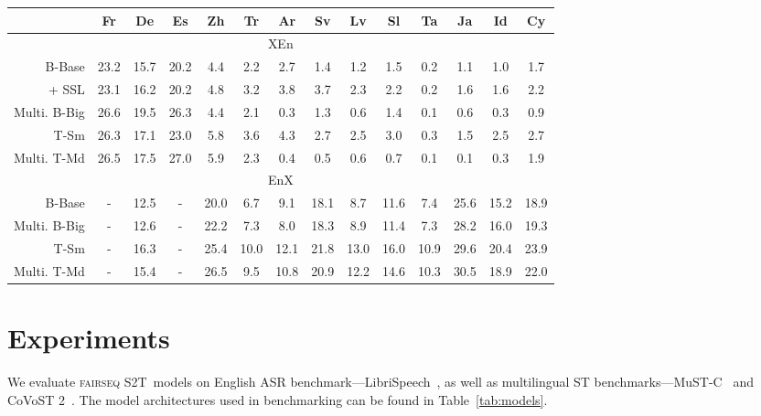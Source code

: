 \documentclass[11pt,a4paper]{article}
\newcommand{\stot}{\textsc{fairseq S2T}}
\begin{document}
\begin{table*}[t]
    \small
    \centering
    \begin{tabular}{r|ccccccccccccc}
    \toprule
         & Fr & De & Es & Zh & Tr & Ar & Sv & Lv & Sl & Ta & Ja & Id & Cy \\
         \midrule
         \multicolumn{14}{c}{XEn} \\
         \midrule
         B-Base & 23.2 & 15.7 & 20.2 & 4.4 & 2.2 & 2.7 & 1.4 & 1.2 & 1.5 & 0.2 & 1.1 & 1.0 & 1.7 \\
         + SSL & 23.1& 16.2& 20.2& 4.8& 3.2& 3.8& 3.7& 2.3& 2.2& 0.2& 1.6& 1.6& 2.2 \\
         Multi. B-Big & 26.6 & 19.5 & 26.3 & 4.4 & 2.1 & 0.3 & 1.3 & 0.6 & 1.4 & 0.1 & 0.6 & 0.3 & 0.9 \\
         T-Sm & 26.3 & 17.1 & 23.0 & 5.8 & 3.6 & 4.3 & 2.7 & 2.5 & 3.0 & 0.3 & 1.5 & 2.5 & 2.7 \\
         Multi. T-Md & 26.5 & 17.5 & 27.0 & 5.9 & 2.3 & 0.4 & 0.5 & 0.6 & 0.7 & 0.1 & 0.1 & 0.3 & 1.9 \\
         \midrule
         \multicolumn{14}{c}{EnX} \\
         \midrule
         B-Base & - & 12.5 & - & 20.0 & 6.7 & 9.1 & 18.1 & 8.7 & 11.6 & 7.4 & 25.6 & 15.2 & 18.9 \\
         Multi. B-Big & - & 12.6 & - & 22.2 & 7.3 & 8.0 & 18.3 & 8.9 & 11.4 & 7.3 & 28.2 & 16.0 & 19.3 \\
         T-Sm & - & 16.3 & - & 25.4 & 10.0 & 12.1 & 21.8 & 13.0 & 16.0 & 10.9 & 29.6 & 20.4 & 23.9 \\
         Multi. T-Md & - & 15.4 & - & 26.5 & 9.5 & 10.8 & 20.9 & 12.2 & 14.6 & 10.3 & 30.5 & 18.9 & 22.0 \\
    \bottomrule
    \end{tabular}

    \caption{\stot~models on CoVoST 2. Test BLEU reported (character-level BLEU for Zh and Ja targets).  Replaced mel-filter bank features with wav2vec ones ~\citep{Schneider2019,wu2020selfsupervised}.  Trained jointly on all 21 X-En directions with temperature-based (T=2) resampling~\citep{arivazhagan2019massively}.  Trained jointly on all 15 En-X directions.}
    \label{tab:covost2_results}
\end{table*}
 
\section{Experiments}
We evaluate \stot~models on English ASR benchmark---LibriSpeech~\citep{panayotov2015librispeech}, as well as multilingual ST benchmarks---MuST-C~\citep{di2019must} and CoVoST 2~\citep{wang2020covost}. The model architectures used in benchmarking can be found in Table~\ref{tab:models}.
\end{document}
